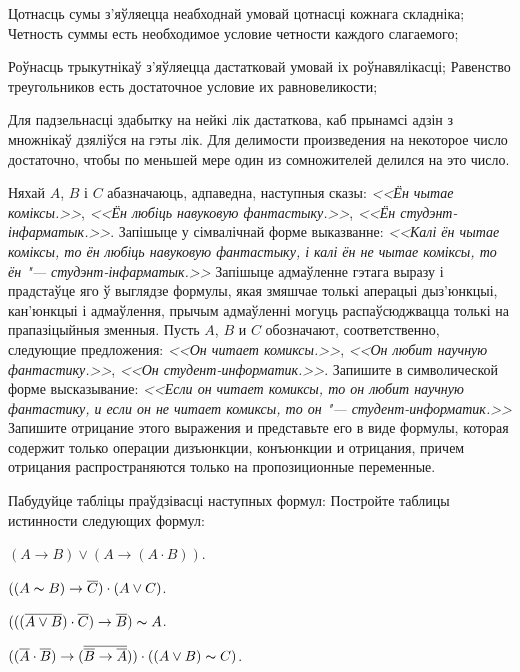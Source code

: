 \documentclass[12pt, a4paper]{article}
\begin{document}
\begin{problemList}
\begin{belarusianEnumerate}
\problemItemSimple
{Цотнасць сумы з'яўляецца неабходнай умовай цотнасці кожнага складніка;}
{Четность суммы есть необходимое условие четности каждого слагаемого;}

\problemItemSimple
{Роўнасць трыкутнікаў з'яўляецца дастатковай умовай іх роўнавялікасці;}
{Равенство треугольников есть достаточное условие их равновеликости;}

\problemItemSimple
{Для падзельнасці здабытку на нейкі лік дастаткова, каб прынамсі адзін з множнікаў дзяліўся на гэты лік.}
{Для делимости произведения на некоторое число достаточно, чтобы по меньшей мере один из сомножителей делился на это число.}

\end{belarusianEnumerate}

\bigskip

\problemItemSimple
{Няхай $A$, $B$ і $C$ абазначаюць, адпаведна, наступныя сказы:
\textit{<<Ён чытае коміксы.>>},
\textit{<<Ён любіць навуковую фантастыку.>>},
\textit{<<Ён студэнт-інфарматык.>>}.
Запішыце у сімвалічнай форме выказванне: \textit{<<Калі ён чытае коміксы,
то ён любіць навуковую фантастыку, і калі ён не чытае коміксы, то ён "---
студэнт-інфарматык.>>} Запішыце адмаўленне гэтага выразу і прадстаўце яго ў выглядзе формулы,
якая змяшчае толькі аперацыі дыз'юнкцыі, кан'юнкцыі і адмаўлення, прычым адмаўленні могуць распаўсюджвацца
толькі на прапазіцыйныя зменныя.}
{Пусть $A$, $B$ и $C$ обозначают, соответственно, следующие предложения:
\textit{<<Он читает комиксы.>>},
\textit{<<Он любит научную фантастику.>>},
\textit{<<Он студент-информатик.>>}.
Запишите в символической форме высказывание: \textit{<<Если он читает
комиксы, то он любит научную фантастику, и если он не читает комиксы, то он "---
студент-информатик.>>} Запишите отрицание этого выражения и представьте
его в виде формулы, которая содержит только операции дизъюнкции, конъюнкции и
отрицания, причем отрицания распространяются только на пропозиционные переменные.}

\newpage

\problemItemWithCommonPart
{Пабудуйце табліцы праўдзівасці наступных формул:}
{Постройте таблицы истинности следующих формул:}
{%
\begin{belarusianEnumerate}
    \item $(A \to B) \vee (A \to (A \cdot B))$.
    \item $((A \thicksim B) \to \overline{C}) \cdot (A \vee C)$.
    \item $(((\overline{A \vee B}) \cdot \overline{C}) \to \overline{B}) \thicksim A$.
    \item $((\overline{A} \cdot \overline{B}) \to (\overline{\overline{B} \to \overline{A}}))
    \cdot ((A \vee B) \thicksim C)$.
\end{belarusianEnumerate}
}


\end{problemList}
\end{document}
